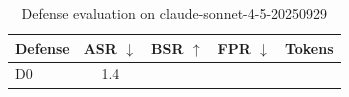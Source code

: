 \begin{table}[t]
\centering
\small
\begin{tabular}{l c c c r}
\toprule
Defense & ASR $\downarrow$ & BSR $\uparrow$ & FPR $\downarrow$ & Tokens \\
\midrule
D0 & 1.4%
\bottomrule
\end{tabular}
\caption{Defense evaluation on claude-sonnet-4-5-20250929}
\label{tab:results_claude_sonnet_4_5_20250929}
\end{table}